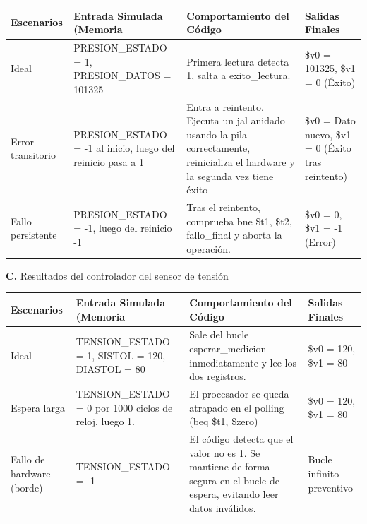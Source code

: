 \documentclass[]{article}
\begin{document}
	\begin{table}[H]
		\centering
		\renewcommand{\arraystretch}{1.5}
		\begin{tabularx}{\textwidth}{|X | X | X | X|}
			\hline
			
			\textbf{Escenarios} & \textbf{Entrada Simulada (Memoria} & \textbf{Comportamiento del Código} & \textbf{Salidas Finales}\\
			
			\hline
			
			Ideal & PRESION\_ESTADO = 1, PRESION\_DATOS = 101325 & Primera lectura detecta 1, salta a exito\_lectura. & \$v0 = 101325, \$v1 = 0 (Éxito) \\
			
			\hline
			
			Error transitorio & PRESION\_ESTADO = -1 al inicio, luego del reinicio pasa a 1 & Entra a reintento. Ejecuta un jal anidado usando la pila correctamente, reinicializa el hardware y la segunda vez tiene éxito & \$v0 = Dato nuevo, \$v1 = 0 (Éxito tras reintento) \\
			
			\hline
			
			Fallo persistente & PRESION\_ESTADO = -1, luego del reinicio -1 & Tras el reintento, comprueba bne \$t1, \$t2, fallo\_final y aborta la operación. & \$v0 = 0, \$v1 = -1 (Error) \\
			
			\hline
		\end{tabularx}
	\end{table}
	
	\newpage
	
	\textbf{C.} Resultados del controlador del sensor de tensión
	
	\begin{table}[H]
		\centering
		\renewcommand{\arraystretch}{1.5}
		\begin{tabularx}{\textwidth}{|X | X | X | X|}
			\hline
			
			\textbf{Escenarios} & \textbf{Entrada Simulada (Memoria} & \textbf{Comportamiento del Código} & \textbf{Salidas Finales}\\
			
			\hline
			
			Ideal & TENSION\_ESTADO = 1, SISTOL = 120, DIASTOL = 80 & Sale del bucle esperar\_medicion inmediatamente y lee los dos registros. & \$v0 = 120, \$v1 = 80 \\
			
			\hline
			
			Espera larga &TENSION\_ESTADO = 0 por 1000 ciclos de reloj, luego 1. & El procesador se queda atrapado en el polling (beq \$t1, \$zero) & \$v0 = 120, \$v1 = 80 \\
			
			\hline
			
			Fallo de hardware (borde) & TENSION\_ESTADO = -1 & El código detecta que el valor no es 1. Se mantiene de forma segura en el bucle de espera, evitando leer datos inválidos. & Bucle infinito preventivo \\
			
			\hline
		\end{tabularx}
	\end{table}
	
\end{document}

